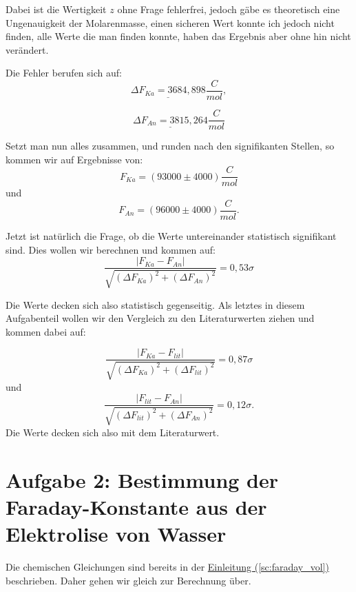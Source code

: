 Dabei ist die Wertigkeit $z$ ohne Frage fehlerfrei, jedoch gäbe es theoretisch eine Ungenauigkeit der Molarenmasse, einen sicheren Wert konnte ich jedoch nicht finden,
alle Werte die man finden konnte, haben das Ergebnis aber ohne hin nicht verändert.

Die Fehler berufen sich auf:
\begin{equation}
    \underline{\Delta F_{Ka} = 3684,898} \frac{C}{mol},
\end{equation}

\begin{equation}
    \underline{\Delta F_{An} = 3815,264} \frac{C}{mol}
\end{equation}


Setzt man nun alles zusammen, und runden nach den signifikanten Stellen, so kommen wir auf Ergebnisse von:
\begin{equation}
    \boxed{
        F_{Ka} = (93000 \pm 4000) \frac{C}{mol}
    }
\end{equation}
und
\begin{equation}
    \boxed{
        F_{An} = (96000 \pm 4000) \frac{C}{mol}.
    }
\end{equation}

Jetzt ist natürlich die Frage, ob die Werte untereinander statistisch signifikant sind. Dies wollen wir berechnen und kommen auf:
\begin{equation}
    \frac{\left| F_{Ka} - F_{An} \right|}{\sqrt{(\Delta F_{Ka})^2 + (\Delta F_{An})^2} } = 0,53\sigma
\end{equation}

Die Werte decken sich also statistisch gegenseitig. 
Als letztes in diesem Aufgabenteil wollen wir den Vergleich zu den Literaturwerten ziehen und kommen dabei auf:

\begin{equation}
    \frac{\left| F_{Ka} - F_{lit} \right|}{\sqrt{(\Delta F_{Ka})^2 + (\Delta F_{lit})^2} } = 0,87\sigma
\end{equation}
und
\begin{equation}
    \frac{\left| F_{lit} - F_{An} \right|}{\sqrt{(\Delta F_{lit})^2 + (\Delta F_{An})^2} } = 0,12\sigma.
\end{equation}
Die Werte decken sich also mit dem Literaturwert.



\section{Aufgabe 2: Bestimmung der Faraday-Konstante aus der Elektrolise von Wasser}
Die chemischen Gleichungen sind bereits in der \hyperref[sc:faraday_vol]{Einleitung (\ref*{sc:faraday_vol})} beschrieben. Daher gehen wir gleich zur Berechnung über.


